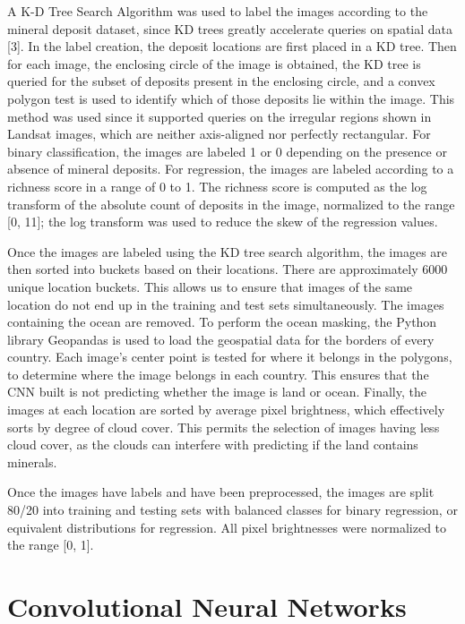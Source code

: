 \documentclass[10pt]{article}
\begin{document}
A K-D Tree Search Algorithm was used to label the images according to the mineral
deposit dataset, since KD trees greatly accelerate queries on spatial data [3].
In the label creation, the deposit locations are first placed in a KD tree. Then
for each image, the enclosing circle of the image is obtained, the KD tree is
queried for the subset of deposits present in the enclosing circle, and a convex
polygon test is used to identify which of those deposits lie within the image.
This method was used since it supported queries on the irregular regions shown
in Landsat images, which are neither axis-aligned nor perfectly rectangular. For
binary classification, the images are labeled 1 or 0 depending on the presence
or absence of mineral deposits. For regression, the images are labeled according
to a richness score in a range of 0 to 1. The richness score is computed as the
log transform of the absolute count of deposits in the image, normalized to the
range [0, 11]; the log transform was used to reduce the skew of the regression
values.

Once the images are labeled using the KD tree search algorithm, the images are
then sorted into buckets based on their locations. There are approximately 6000
unique location buckets. This allows us to ensure that images of the same
location do not end up in the training and test sets simultaneously. The images
containing the ocean are removed. To perform the ocean masking, the Python
library Geopandas is used to load the geospatial data for the borders of every
country. Each image's center point is tested for where it belongs in the polygons,
to determine where the image belongs in each country. This ensures that the CNN
built is not predicting whether the image is land or ocean. Finally, the images
at each location are sorted by average pixel brightness, which effectively sorts
by degree of cloud cover. This permits the selection of images having less cloud
cover, as the clouds can interfere with predicting if the land contains minerals.

Once the images have labels and have been preprocessed, the images are split
80/20 into training and testing sets with balanced classes for binary regression,
or equivalent distributions for regression. All pixel brightnesses were
normalized to the range [0, 1].

\section{Convolutional Neural Networks}
\end{document}
